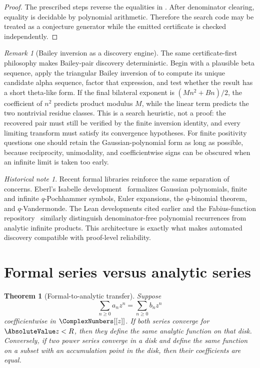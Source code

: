 \documentclass[11pt,a4paper,oneside,openany]{book}
\newtheorem{theorem}{Theorem}[chapter]
\theoremstyle{definition}
\theoremstyle{remark}
\newtheorem{remark}[remark]{Remark}
\newtheorem{historicalnote}[historicalnote]{Historical note}
\begin{document}
\begin{proof}
The prescribed steps reverse the equalities in
.  After denominator clearing, equality is decidable by polynomial arithmetic.  Therefore the search code may be treated as a conjecture generator while the emitted certificate is checked independently.
\end{proof}

\begin{remark}[Bailey inversion as a discovery engine]
The same certificate-first philosophy makes Bailey-pair discovery
deterministic.  Begin with a plausible beta sequence, apply the triangular
Bailey inversion of  to compute its unique candidate
alpha sequence, factor that expression, and test whether the result has a
short theta-like form.  If the final bilateral exponent is
\((Mn^2+Bn)/2\), the coefficient of \(n^2\) predicts product modulus \(M\),
while the linear term predicts the two nontrivial residue classes.  This is a
search heuristic, not a proof: the recovered pair must still be verified by
the finite inversion identity, and every limiting transform must satisfy its
convergence hypotheses.  For finite positivity questions one should retain
the Gaussian-polynomial form as long as possible, because reciprocity,
unimodality, and coefficientwise signs can be obscured when an infinite limit
is taken too early.
\end{remark}

\begin{historicalnote}
Recent formal libraries reinforce the same separation of concerns.  Eberl's Isabelle development~\cite{Eberl2024QAnalogues} formalizes Gaussian polynomials, finite and infinite $q$-Pochhammer symbols, Euler expansions, the $q$-binomial theorem, and $q$-Vandermonde.  The Lean developments cited earlier and the Fabius-function repository~\cite{ReshetnikovProveIt2026} similarly distinguish denominator-free polynomial recurrences from analytic infinite products.  This architecture is exactly what makes automated discovery compatible with proof-level reliability.
\end{historicalnote}

\section{Formal series versus analytic series}

\begin{theorem}[Formal-to-analytic transfer]\label{thm:formal-analytic-transfer}
Suppose
\[
 \sum_{n\ge0}a_nz^n=\sum_{n\ge0}b_nz^n
\]
coefficientwise in $\ComplexNumbers[[z]]$.  If both series converge for $\AbsoluteValue z<R$, then they define the same analytic function on that disk.  Conversely, if two power series converge in a disk and define the same function on a subset with an accumulation point in the disk, then their coefficients are equal.
\end{theorem}
\end{document}
